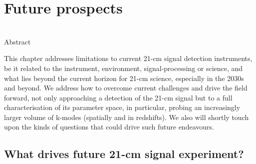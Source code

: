 \chapter{Future prospects}
\label{chapter:koopmans_bernardi}

\begin{bf}
  \author{L\'{e}on V. E. Koopmans (Kapteyn Astronomical Institute, University of Groningen),\\ Gianni Bernardi (INAF-IRA \& Rhodes University)}\\
  
Abstract\\
\end{bf}

\noindent This chapter addresses limitations to current 21-cm signal detection instruments, be it related to the instrument, environment, signal-processing or science, and what lies beyond the current horizon for 21-cm science, especially in the 2030s and beyond. We address how to overcome current challenges and drive the field forward, not only approaching a detection of the 21-cm signal but to a full characterisation of its parameter space, in particular, probing an increasingly larger volume of k-modes (spatially and in redshifts). We also will shortly touch upon the kinds of questions that could drive such future endeavours. 

\section{What drives future 21-cm signal experiment?}

